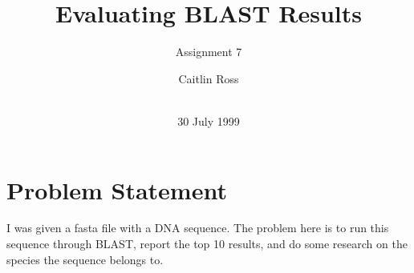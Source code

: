 \documentclass{acm_proc_article-sp}
\begin{document}
\title{Evaluating BLAST Results}
\subtitle{Assignment 7}
%
%
%
%
%

%
\author{
	\alignauthor Caitlin Ross\\
	 \\
}

\date{30 July 1999}

\maketitle

\begin{abstract}

\end{abstract}


\section{Problem Statement}
I was given a fasta file with a DNA sequence.  The problem here is to run this sequence through BLAST, report the top 10 results, and do some research on the species the sequence belongs to.
\end{document}

